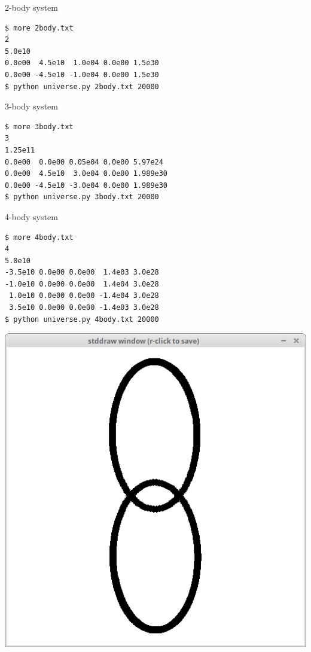 \documentclass[8pt,a4paper,compress,handout]{beamer}
\begin{document}
\begin{frame}[fragile]
\begin{minipage}{200pt}
2-body system
\begin{lstlisting}[language={}]
$ more 2body.txt
2 
5.0e10 
0.0e00  4.5e10  1.0e04 0.0e00 1.5e30 
0.0e00 -4.5e10 -1.0e04 0.0e00 1.5e30 
$ python universe.py 2body.txt 20000
\end{lstlisting}

\bigskip

3-body system
\begin{lstlisting}[language={}]
$ more 3body.txt
3 
1.25e11 
0.0e00  0.0e00 0.05e04 0.0e00 5.97e24 
0.0e00  4.5e10  3.0e04 0.0e00 1.989e30 
0.0e00 -4.5e10 -3.0e04 0.0e00 1.989e30 
$ python universe.py 3body.txt 20000
\end{lstlisting}

\bigskip

4-body system
\begin{lstlisting}[language={}]
$ more 4body.txt
4 
5.0e10 
-3.5e10 0.0e00 0.0e00  1.4e03 3.0e28 
-1.0e10 0.0e00 0.0e00  1.4e04 3.0e28 
 1.0e10 0.0e00 0.0e00 -1.4e04 3.0e28 
 3.5e10 0.0e00 0.0e00 -1.4e03 3.0e28 
$ python universe.py 4body.txt 20000
\end{lstlisting}
\end{minipage}%
\hfill
\begin{minipage}{100pt}
\begin{center}
\includegraphics[scale=0.13]{figures/2body.png}


\end{center}
\end{minipage}
\end{frame}
\end{document}
